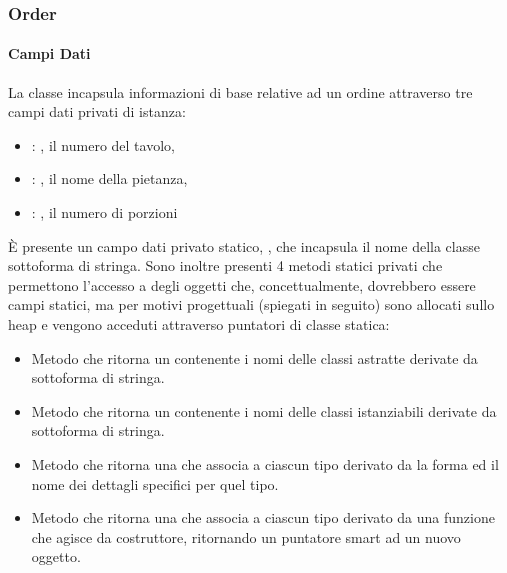 \subsubsection{Order} %
\label{ssub:order}
\paragraph{Campi Dati} %
\label{par:campi_dati}
La classe  incapsula informazioni di base relative ad un ordine attraverso tre campi dati privati di istanza:
\begin{itemize}
	\item {}: , il numero del tavolo,
	\item {}: , il nome della pietanza,
	\item {}: , il numero di porzioni
\end{itemize}
È presente un campo dati privato statico, , che incapsula il nome della classe sottoforma di stringa. Sono inoltre presenti 4 metodi statici privati che permettono l'accesso a degli oggetti che, concettualmente, dovrebbero essere campi statici, ma per motivi progettuali (spiegati in seguito) sono allocati sullo heap e vengono acceduti attraverso puntatori di classe statica:
\begin{itemize}
	\item {}\newline
	Metodo che ritorna un  contenente i nomi delle classi astratte derivate da  sottoforma di stringa.
	\item {}\newline
	Metodo che ritorna un  contenente i nomi delle classi istanziabili derivate da  sottoforma di stringa.
	\item {}\newline
	Metodo che ritorna una  che associa a ciascun tipo derivato da  la forma ed il nome dei dettagli specifici per quel tipo.
	\item {}\newline
	\newline
	Metodo che ritorna una  che associa a ciascun tipo derivato da  una funzione che agisce da costruttore, ritornando un puntatore smart ad un nuovo oggetto.
\end{itemize}
